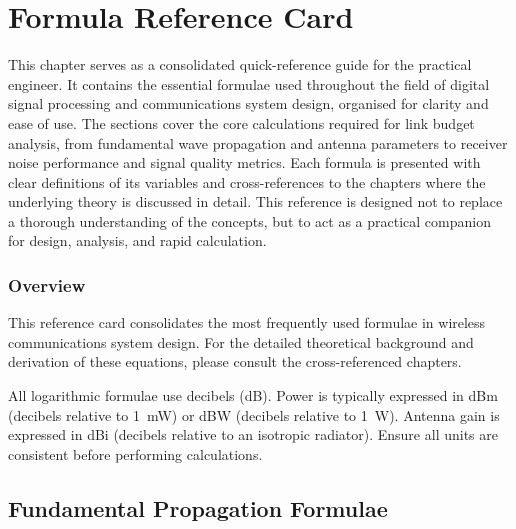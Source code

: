 
\chapter{Formula Reference Card}
\label{ch:formula-reference-card}

\begin{nontechnical}
    This chapter serves as a consolidated quick-reference guide for the practical engineer. It contains the essential formulae used throughout the field of digital signal processing and communications system design, organised for clarity and ease of use. The sections cover the core calculations required for link budget analysis, from fundamental wave propagation and antenna parameters to receiver noise performance and signal quality metrics. Each formula is presented with clear definitions of its variables and cross-references to the chapters where the underlying theory is discussed in detail. This reference is designed not to replace a thorough understanding of the concepts, but to act as a practical companion for design, analysis, and rapid calculation.
\end{nontechnical}

\subsection{Overview}

This reference card consolidates the most frequently used formulae in wireless communications system design. For the detailed theoretical background and derivation of these equations, please consult the cross-referenced chapters.

\begin{keyconcept}
    All logarithmic formulae use decibels (dB). Power is typically expressed in dBm (decibels relative to 1~mW) or dBW (decibels relative to 1~W). Antenna gain is expressed in dBi (decibels relative to an isotropic radiator). Ensure all units are consistent before performing calculations.
\end{keyconcept}

\section{Fundamental Propagation Formulae}

